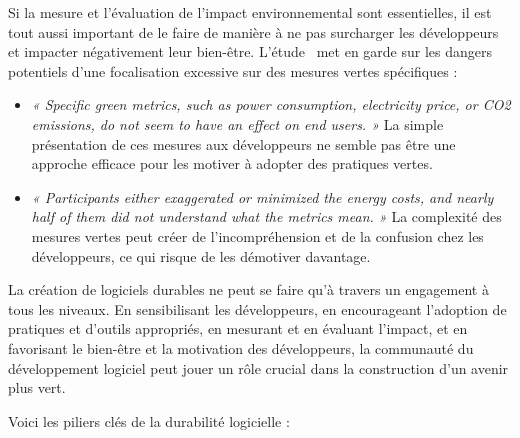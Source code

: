 Si la mesure et l'évaluation de l'impact environnemental sont essentielles, il est tout aussi important de le faire de manière à ne pas surcharger les développeurs et impacter négativement leur bien-être. L'étude~\cite{ImpactGreenFeedback} met en garde sur les dangers potentiels d'une focalisation excessive sur des mesures vertes spécifiques :
\begin{itemize}
    \item \emph{« Specific green metrics, such as power consumption, electricity price, or CO2 emissions, do not seem to have an effect on end users. »} La simple présentation de ces mesures aux développeurs ne semble pas être une approche efficace pour les motiver à adopter des pratiques vertes.
    \item \emph{« Participants either exaggerated or minimized the energy costs, and nearly half of them did not understand what the metrics mean. »} La complexité des mesures vertes peut créer de l'incompréhension et de la confusion chez les développeurs, ce qui risque de les démotiver davantage.
\end{itemize}



La création de logiciels durables ne peut se faire qu'à travers un engagement à tous les niveaux. En sensibilisant les développeurs, en encourageant l'adoption de pratiques et d'outils appropriés, en mesurant et en évaluant l'impact, et en favorisant le bien-être et la motivation des développeurs, la communauté du développement logiciel peut jouer un rôle crucial dans la construction d'un avenir plus vert.


Voici les piliers clés de la durabilité logicielle :

